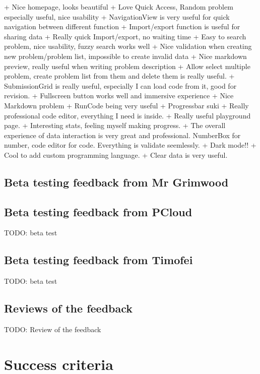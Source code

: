 \documentclass[a4paper]{report}
\begin{document}
+ Nice homepage, looks beautiful
+ Love Quick Access, Random problem especially useful, nice usability
+ NavigationView is very useful for quick navigation between different function
+ Import/export function is useful for sharing data
+ Really quick Import/export, no waiting time
+ Easy to search problem, nice usability, fuzzy search works well
+ Nice validation when creating new problem/problem list, impossible to create invalid data
+ Nice markdown preview, really useful when writing problem description
+ Allow select multiple problem, create problem list from them and delete them is really useful.
+ SubmissionGrid is really useful, especially I can load code from it, good for revision.
+ Fullscreen button works well and immersive experience
+ Nice Markdown problem
+ RunCode being very useful
+ Progressbar suki
+ Really professional code editor, everything I need is inside.
+ Really useful playground page.
+ Interesting stats, feeling myself making progress.
+ The overall experience of data interaction is very great and professional. NumberBox for number, code editor for code. Everything is validate seemlessly.
+ Dark mode!!
+ Cool to add custom programming language.
+ Clear data is very useful.

\subsection{Beta testing feedback from Mr Grimwood}


\subsection{Beta testing feedback from PCloud}

TODO: beta test

\subsection{Beta testing feedback from Timofei}

TODO: beta test


\subsection{Reviews of the feedback}

TODO: Review of the feedback

\section{Success criteria}
\end{document}
